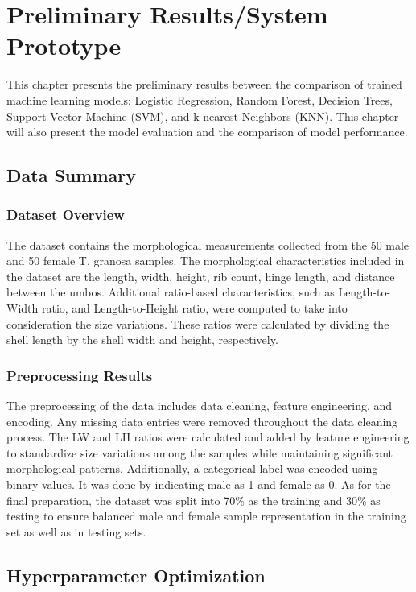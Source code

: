 

\chapter{Preliminary Results/System Prototype}
This chapter presents the preliminary results between the comparison of trained machine learning models: Logistic Regression, Random Forest,  Decision Trees, Support Vector Machine (SVM), and k-nearest Neighbors (KNN).  This chapter will also present the model evaluation and the comparison of model performance. 

\section{Data Summary}
\subsection{Dataset Overview}

The dataset contains the morphological measurements collected from the 50 male and 50 female T. granosa samples. The morphological characteristics included in the dataset are the length, width, height, rib count, hinge length, and distance between the umbos. Additional ratio-based characteristics, such as Length-to-Width ratio, and Length-to-Height ratio, were computed to take into consideration the size variations. These ratios were calculated by dividing the shell length by the shell width and height, respectively. 

\subsection{Preprocessing Results}

The preprocessing of the data includes data cleaning, feature engineering, and encoding. Any missing data entries were removed throughout the data cleaning process. The LW and LH ratios were calculated and added by feature engineering to standardize size variations among the samples while maintaining significant morphological patterns. Additionally, a categorical label was encoded using binary values. It was done by indicating male as 1 and female as 0. As for the final preparation, the dataset was split into 70\% as the training and 30\% as testing to ensure balanced male and female sample representation in the training set as well as in testing sets.

\section{Hyperparameter Optimization}

